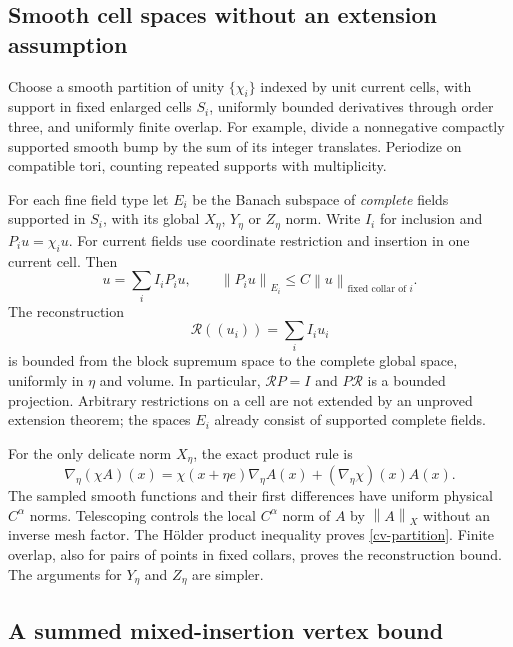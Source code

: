 \documentclass[11pt]{article}
\theoremstyle{remark}
\newcommand{\norm}[1]{\left\|#1\right\|}
\begin{document}
\subsection{Smooth cell spaces without an extension assumption}
\label{cv-cells-section}

Choose a smooth partition of unity $\{\chi_i\}$ indexed by
unit current cells, with support in fixed enlarged cells
$S_i$, uniformly bounded derivatives through order three, and
uniformly finite overlap. For example, divide a nonnegative
compactly supported smooth bump by the sum of its integer
translates. Periodize on compatible tori, counting repeated
supports with multiplicity.

For each fine field type let $E_i$ be the Banach subspace of
\emph{complete} fields supported in $S_i$, with its global
$X_\eta$, $Y_\eta$ or $Z_\eta$ norm. Write $I_i$ for inclusion
and $P_iu=\chi_i u$. For current fields use coordinate
restriction and insertion in one current cell. Then
\begin{equation}\label{cv-partition}
 u=\sum_iI_iP_iu,\qquad
 \norm{P_iu}_{E_i}\le C\norm u_{\text{fixed collar of }i}.
\end{equation}
The reconstruction
\[
 \mathscr R((u_i))=\sum_iI_iu_i
\]
is bounded from the block supremum space to the complete
global space, uniformly in $\eta$ and volume. In particular,
$\mathscr RP=I$ and $P\mathscr R$ is a bounded projection.
Arbitrary restrictions on a cell are not extended by an
unproved extension theorem; the spaces $E_i$ already consist
of supported complete fields.

For the only delicate norm $X_\eta$, the exact product rule is
\begin{equation}\label{cv-product-rule}
 \nabla_\eta(\chi A)(x)
 =\chi(x+\eta e)\nabla_\eta A(x)
          +(\nabla_\eta\chi)(x)A(x).
\end{equation}
The sampled smooth functions and their first differences have
uniform physical $C^\alpha$ norms. Telescoping controls the
local $C^\alpha$ norm of $A$ by $\norm A_X$ without an inverse
mesh factor. The H\"older product inequality proves
\eqref{cv-partition}. Finite overlap, also for pairs of points
in fixed collars, proves the reconstruction bound. The
arguments for $Y_\eta$ and $Z_\eta$ are simpler.

\subsection{A summed mixed-insertion vertex bound}
\label{cv-vertex-section}
\end{document}
